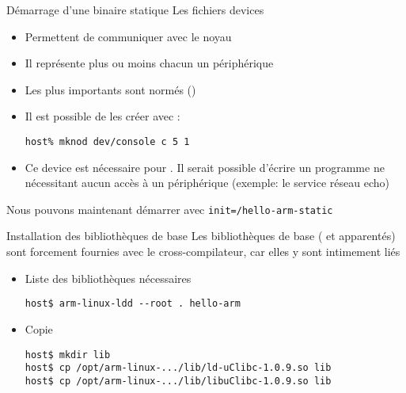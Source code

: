 \begin{frame}[fragile=singleslide]{Démarrage d'une binaire statique}
  Les fichiers devices
  \begin{itemize}
  \item Permettent de communiquer avec le noyau
  \item Il représente plus ou moins chacun un périphérique
  \item Les plus importants sont normés ()
  \item Il est possible de les créer avec :
    \begin{lstlisting}
host% mknod dev/console c 5 1
    \end{lstlisting}
  \item  Ce  device  est  nécessaire  pour  .   Il  serait
    possible  d'écrire un programme  ne nécessitant  aucun accès  à un
    périphérique (exemple: le service réseau echo)
  \end{itemize}
  Nous pouvons maintenant démarrer avec \verb+init=/hello-arm-static+
\end{frame}

\begin{frame}[fragile=singleslide]{Installation des bibliothèques de base}
  Les bibliothèques de base  ( et apparentés) sont forcement
  fournies avec le cross-compilateur, car elles y sont intimement liés
  \begin{itemize}
  \item Liste des bibliothèques nécessaires
    \begin{lstlisting}
host$ arm-linux-ldd --root . hello-arm
    \end{lstlisting}
    \item Copie
    \begin{lstlisting}
host$ mkdir lib
host$ cp /opt/arm-linux-.../lib/ld-uClibc-1.0.9.so lib
host$ cp /opt/arm-linux-.../lib/libuClibc-1.0.9.so lib
    \end{lstlisting}
  \end{itemize}
\end{frame}

